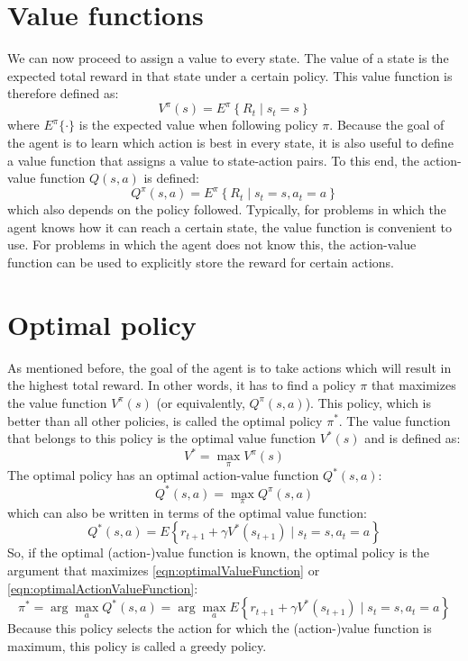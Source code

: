 \documentclass[a4paper,11pt]{mscLiterature}
\begin{document}
\section{Value functions}
We can now proceed to assign a value to every state. The value of a state is the expected total reward in that state under a certain policy. This value function is therefore defined as:
\begin{equation}\label{eqn:valueFunctionDefinition} 
	V^\pi(s)=E^\pi \left\{ R_t \mid s_t=s  \right\}
\end{equation}
where $E^\pi\{\cdot\}$ is the expected value when following policy $\pi$. Because the goal of the agent is to learn which action is best in every state, it is also useful to define a value function that assigns a value to state-action pairs. To this end, the action-value function $Q(s,a)$ is defined:
\begin{equation}\label{eqn:actionValueFunctionDefinition} 
	Q^\pi(s,a)=E^\pi \left\{ R_t \mid s_t=s,a_t=a \right\}
\end{equation}
which also depends on the policy followed. Typically, for problems in which the agent knows how it can reach a certain state, the value function is convenient to use. For problems in which the agent does not know this, the action-value function can be used to explicitly store the reward for certain actions.



	\section{Optimal policy}
As mentioned before, the goal of the agent is to take actions which will result in the highest total reward. In other words, it has to find a policy $\pi$ that maximizes the value function $V^\pi(s)$ (or equivalently, $Q^\pi(s,a)$). This policy, which is better than all other policies, is called the optimal policy $\pi^*$. The value function that belongs to this policy is the optimal value function $V^*(s)$ and is defined as:
\begin{equation}\label{eqn:optimalValueFunction}
	V^*=\max_{\pi} V^\pi(s)
\end{equation}
The optimal policy has an optimal action-value function $Q^*(s,a)$:
\begin{equation}\label{eqn:optimalActionValueFunction} 
	Q^*(s,a) = \max_{\pi} Q^\pi(s,a) 
\end{equation}
which can also be written in terms of the optimal value function:
\begin{equation}
	Q^*(s,a) = E \left\{ r_{t+1} + \gamma V^* (s_{t+1}) \mid s_t=s,a_t=a \right\} 
\end{equation}
So, if the optimal (action-)value function is known, the optimal policy is the argument that maximizes \eqref{eqn:optimalValueFunction} or \eqref{eqn:optimalActionValueFunction}:
\begin{equation}\label{eqn:optimalPolicy}
	\pi^* = \arg\max_a Q^*(s,a) = \arg\max_a E \left\{ r_{t+1} + \gamma V^* (s_{t+1}) \mid s_t=s,a_t=a \right\} 
\end{equation}
Because this policy selects the action for which the (action-)value function is maximum, this policy is called a greedy policy.
\end{document}
